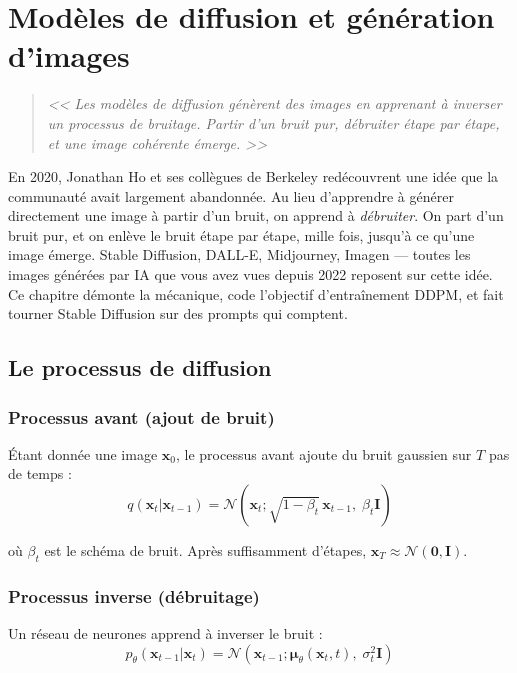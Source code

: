 \chapter{Mod\`eles de diffusion et g\'en\'eration d'images}
\label{ch:diffusion}

\begin{quote}
\emph{<< Les mod\`eles de diffusion g\'en\`erent des images en apprenant \`a inverser un processus de bruitage. Partir d'un bruit pur, d\'ebruiter \'etape par \'etape, et une image coh\'erente \'emerge. >>}
\end{quote}

En 2020, Jonathan Ho et ses collègues de Berkeley redécouvrent une idée que la communauté avait largement abandonnée. Au lieu d'apprendre à générer directement une image à partir d'un bruit, on apprend à \emph{débruiter}. On part d'un bruit pur, et on enlève le bruit étape par étape, mille fois, jusqu'à ce qu'une image émerge. Stable Diffusion, DALL-E, Midjourney, Imagen --- toutes les images générées par IA que vous avez vues depuis 2022 reposent sur cette idée. Ce chapitre démonte la mécanique, code l'objectif d'entraînement DDPM, et fait tourner Stable Diffusion sur des prompts qui comptent.
\section{Le processus de diffusion}

\subsection{Processus avant (ajout de bruit)}

\'Etant donn\'ee une image $\mathbf{x}_0$, le processus avant ajoute du bruit gaussien sur $T$ pas de temps :
\[
q(\mathbf{x}_t | \mathbf{x}_{t-1}) = \mathcal{N}(\mathbf{x}_t; \sqrt{1-\beta_t}\,\mathbf{x}_{t-1},\; \beta_t \mathbf{I})
\]

o\`u $\beta_t$ est le sch\'ema de bruit. Apr\`es suffisamment d'\'etapes, $\mathbf{x}_T \approx \mathcal{N}(\mathbf{0}, \mathbf{I})$.

\subsection{Processus inverse (d\'ebruitage)}

Un r\'eseau de neurones apprend \`a inverser le bruit :
\[
p_\theta(\mathbf{x}_{t-1} | \mathbf{x}_t) = \mathcal{N}(\mathbf{x}_{t-1}; \boldsymbol{\mu}_\theta(\mathbf{x}_t, t),\; \sigma_t^2 \mathbf{I})
\]

